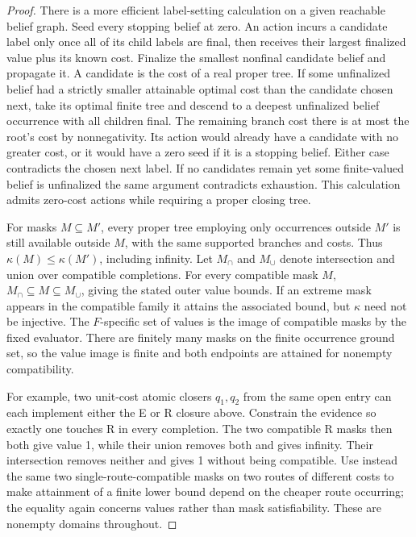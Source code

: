 \begin{proof}
There is a more efficient label-setting calculation on a given reachable belief graph. Seed every stopping belief at zero. An action incurs a candidate label only once all of its child labels are final, then receives their largest finalized value plus its known cost. Finalize the smallest nonfinal candidate belief and propagate it. A candidate is the cost of a real proper tree. If some unfinalized belief had a strictly smaller attainable optimal cost than the candidate chosen next, take its optimal finite tree and descend to a deepest unfinalized belief occurrence with all children final. The remaining branch cost there is at most the root's cost by nonnegativity. Its action would already have a candidate with no greater cost, or it would have a zero seed if it is a stopping belief. Either case contradicts the chosen next label. If no candidates remain yet some finite-valued belief is unfinalized the same argument contradicts exhaustion. This calculation admits zero-cost actions while requiring a proper closing tree.

For masks \(M\subseteq M'\), every proper tree employing only occurrences outside \(M'\) is still available outside \(M\), with the same supported branches and costs. Thus \(\kappa(M)\le\kappa(M')\), including infinity. Let \(M_{\cap}\) and \(M_{\cup}\) denote intersection and union over compatible completions. For every compatible mask \(M\), \(M_{\cap}\subseteq M\subseteq M_{\cup}\), giving the stated outer value bounds. If an extreme mask appears in the compatible family it attains the associated bound, but \(\kappa\) need not be injective. The \(F\)-specific set of values is the image of compatible masks by the fixed evaluator. There are finitely many masks on the finite occurrence ground set, so the value image is finite and both endpoints are attained for nonempty compatibility.

For example, two unit-cost atomic closers \(q_1,q_2\) from the same open entry can each implement either the E or R closure above. Constrain the evidence so exactly one touches R in every completion. The two compatible R masks then both give value 1, while their union removes both and gives infinity. Their intersection removes neither and gives 1 without being compatible. Use instead the same two single-route-compatible masks on two routes of different costs to make attainment of a finite lower bound depend on the cheaper route occurring; the equality again concerns values rather than mask satisfiability. These are nonempty domains throughout.


\end{proof}
